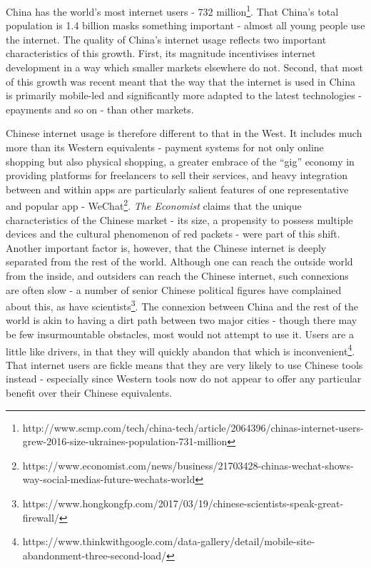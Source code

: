 \documentclass[11pt,a4paper]{report}
\begin{document}
\begin{multicols}{2}
	
China has the world's most internet users - 732 million\footnote{http://www.scmp.com/tech/china-tech/article/2064396/chinas-internet-users-grew-2016-size-ukraines-population-731-million}.
That China's total population is 1.4 billion masks something important -
almost all young people use the internet. The quality of China's
internet usage reflects two important characteristics of this growth.
First, its magnitude incentivises internet development in a way which
smaller markets elsewhere do not. Second, that most of this growth was
recent meant that the way that the internet is used in China is
primarily mobile-led and significantly more adapted to the latest
technologies - epayments and so on - than other markets.

Chinese internet usage is therefore different to that in the West. It
includes much more than its Western equivalents - payment systems for
not only online shopping but also physical shopping, a greater embrace
of the ``gig'' economy in providing platforms for freelancers to sell
their services, and heavy integration between and within apps are
particularly salient features of one representative and popular app -
WeChat\footnote{https://www.economist.com/news/business/21703428-chinas-wechat-shows-way-social-medias-future-wechats-world}.
\emph{The Economist} claims that the unique characteristics of the
Chinese market - its size, a propensity to possess multiple devices and
the cultural phenomenon of red packets - were part of this shift.
Another important factor is, however, that the Chinese internet is
deeply separated from the rest of the world. Although one can reach the
outside world from the inside, and outsiders can reach the Chinese
internet, such connexions are often slow - a number of senior Chinese
political figures have complained about this, as have
scientists\footnote{https://www.hongkongfp.com/2017/03/19/chinese-scientists-speak-great-firewall/}.
The connexion between China and the rest of the world is akin to having
a dirt path between two major cities - though there may be few
insurmountable obstacles, most would not attempt to use it. Users are a
little like drivers, in that they will quickly abandon that which is
inconvenient\footnote{https://www.thinkwithgoogle.com/data-gallery/detail/mobile-site-abandonment-three-second-load/}.
That internet users are fickle means that they are very likely to use
Chinese tools instead - especially since Western tools now do not appear
to offer any particular benefit over their Chinese equivalents.


\end{multicols}
\end{document}
